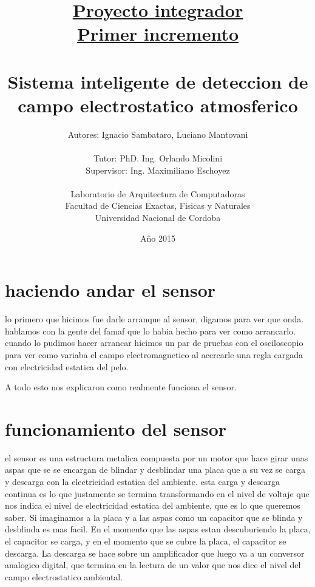 \documentclass[a4paper]{article}
\title{\underline{Proyecto integrador} \\
\large \underline{Primer incremento} \\
\huge \textbf{ \\ Sistema inteligente de deteccion de campo electrostatico atmosferico} \\ }
\author{Autores: Ignacio Sambataro, Luciano Mantovani\\ \\
  \large Tutor: PhD. Ing. Orlando Micolini \\
  \large Supervisor: Ing. Maximiliano Eschoyez \\ \\
  \small Laboratorio de Arquitectura de Computadoras\\
  \small Facultad de Ciencias Exactas, Fisicas y Naturales\\
  \small Universidad Nacional de Cordoba\\
  \date{Año 2015}
}
\begin{document}
\maketitle
\thispagestyle{empty}

\clearpage

\tableofcontents
\thispagestyle{empty}

\clearpage
\setcounter{page}{1}





\section{haciendo andar el sensor} %
\label{sec:haciendo_andar_el_sensor}
lo primero que hicimos fue darle arranque al sensor, digamos para ver que onda. hablamos con la gente del famaf que lo habia hecho para ver como arrancarlo. cuando lo pudimos hacer arrancar hicimos un par de pruebas con el osciloscopio para ver como variaba el campo electromagnetico al acercarle una regla cargada con electricidad estatica del pelo.

A todo esto nos explicaron como realmente funciona el sensor.




\section{funcionamiento del sensor} %
\label{sec:funcionamiento_del_sensor}
el sensor es una estructura metalica compuesta por un motor que hace girar unas aspas que se se encargan de blindar y desblindar una placa que a su vez se carga y descarga con la electricidad estatica del ambiente. esta carga y descarga continua es lo que justamente se termina transformando en el nivel de voltaje que nos indica el nivel de electricidad estatica del ambiente, que es lo que queremos saber. Si imaginamos a la placa y a las aspas como un capacitor que se blinda y desblinda es mas facil. En el momento que las aspas estan descuburiendo la placa, el capacitor se carga, y en el momento que se cubre la placa, el capacitor se descarga. La descarga se hace sobre un amplificador que luego va a un conversor analogico digital, que termina en la lectura de un valor que nos dice el nivel del campo electrostatico ambiental.

\end{document}
